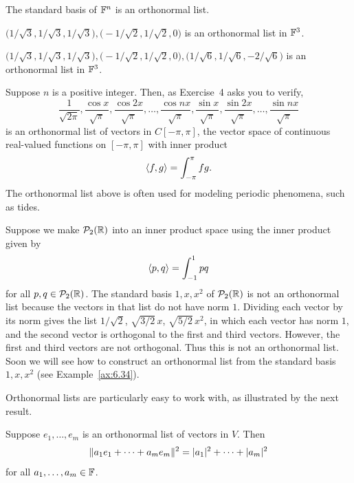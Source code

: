 \begin{example}\label{ax:6.23}\leavevmode
\begin{parts}
\item The standard basis of $\mathbb{F}^n$ is an orthonormal list.
\item $\bigl(1/\sqrt3,1/\sqrt3,1/\sqrt3\bigr),
  \bigl(-1/\sqrt2,1/\sqrt2,0\bigr)$ is an orthonormal list
  in $\mathbb{F}^3$.
\item $\bigl(1/\sqrt3,1/\sqrt3,1/\sqrt3\bigr),
  \bigl(-1/\sqrt2,1/\sqrt2,0\bigr),
  \bigl(1/\sqrt6,1/\sqrt6,-2/\sqrt6\bigr)$ is an
  orthonormal list in $\mathbb{F}^3$.
\item Suppose $n$ is a positive integer. Then, as Exercise~4 asks you to verify,
  \[ \frac{1}{\sqrt{2\pi}}, \frac{\cos x}{\sqrt\pi}, \frac{\cos 2x}{\sqrt\pi},
     \dots, \frac{\cos nx}{\sqrt\pi}, \frac{\sin x}{\sqrt\pi},
     \frac{\sin 2x}{\sqrt\pi}, \dots, \frac{\sin nx}{\sqrt\pi} \]
  is an orthonormal list of vectors in $C[-\pi,\pi]$, the vector space of
  continuous real-valued functions on $[-\pi,\pi]$ with inner product
  \[ \langle f, g \rangle = \int_{-\pi}^{\pi} fg. \]
  The orthonormal list above is often used for modeling periodic phenomena,
  such as tides.
\item Suppose we make $\mathcal{P}_2(\mathbb{R})$ into an inner product space using the inner
  product given by
  \[ \langle p, q \rangle = \int_{-1}^{1} pq \]
  for all $p,q\in\mathcal{P}_2(\mathbb{R})$. The standard basis $1,x,x^2$ of $\mathcal{P}_2(\mathbb{R})$ is
  not an orthonormal list because the vectors in that list do not have norm $1$.
  Dividing each vector by its norm gives the list $1/\sqrt2$,
  $\sqrt{3/2}\,x$, $\sqrt{5/2}\,x^2$, in which each vector has norm $1$, and the
  second vector is orthogonal to the first and third vectors. However, the
  first and third vectors are not orthogonal. Thus this is not an orthonormal
  list. Soon we will see how to construct an orthonormal list from the standard
  basis $1,x,x^2$ (see Example~\ref{ax:6.34}).
\end{parts}
\end{example}

Orthonormal lists are particularly easy to work with, as illustrated by the
next result.

\begin{result}\label{ax:6.24}
Suppose $e_1,\dots,e_m$ is an orthonormal list of vectors in $V$. Then
\[ \lVert a_1e_1+\cdots+a_me_m \rVert^2 = \lvert a_1 \rvert^2+\cdots+\lvert a_m \rvert^2 \]
for all $a_1,\dots,a_m\in\mathbb{F}$.
\end{result}


